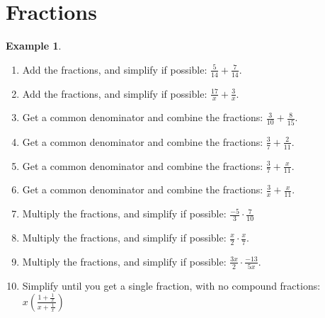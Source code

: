 \documentclass[oneside]{book}
\newcommand{\sfrac}[2]{\frac{\,#1\,}{#2}}
\theoremstyle{definition}
\newtheorem{example}{Example}
\theoremstyle{solution}
\newcommand{\handoutfill}{}
\newcommand{\handoutitemsep}{}
\newcommand{\handoutfill}{\vfill}
\newcommand{\handoutitemsep}{\itemsep=\fill}
\begin{document}
\section{Fractions}

\begin{example}
\begin{enumerate}
\handoutitemsep
\item Add the fractions, and simplify if possible: $\frac{5}{14}+\frac{7}{14}$.
\item Add the fractions, and simplify if possible: $\frac{17}{x} + \frac{3}{x}$.
\item Get a common denominator and combine the fractions: $\frac{3}{10}
  + \frac{8}{15}$.

\item Get a common denominator and combine the fractions: $\frac{3}{7}
  + \frac{2}{11}$.

\item Get a common denominator and combine the fractions: $\frac{3}{7}
  + \frac{x}{11}$.

\item Get a common denominator and combine the fractions: $\frac{3}{x}
  + \frac{x}{11}$.

\item Multiply the fractions, and simplify if possible: $\frac{-5}{3}\cdot \frac{7}{10}$

\item Multiply the fractions, and simplify if possible: $\frac{x}{2}\cdot \frac{x}{7}$.

\item Multiply the fractions, and simplify if possible: $\frac{3x}{2}\cdot \frac{-13}{5x}$.
\item Simplify until you get a single fraction, with no compound fractions: $x\left(\frac{1+\sfrac 1x}{x+\sfrac 1x}\right)$

\handoutfill
\end{enumerate}
\end{example}
\end{document}

